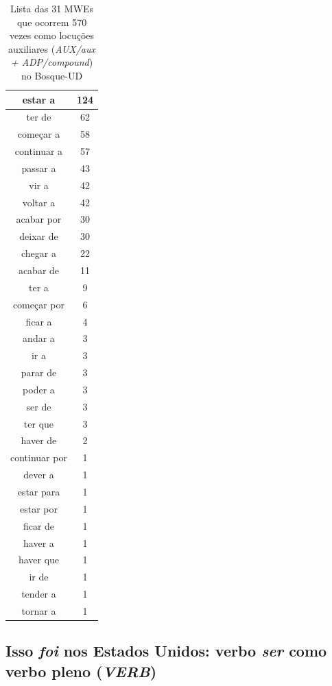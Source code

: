 \documentclass[output=paper,colorlinks,citecolor=brown]{langscibook}
\begin{document}
\begin{table}[]
{\begin{tabular}{|c|c|}
						estar a & 124\\\hline
						ter de & 62\\\hline
						começar a & 58\\\hline
						continuar a & 57\\\hline
						passar a & 43\\\hline
						vir a & 42\\\hline
						voltar a & 42\\\hline
						acabar por & 30\\\hline
						deixar de & 30\\\hline
						chegar a & 22\\\hline
						acabar de & 11\\\hline
						ter a & 9\\\hline
						começar por & 6\\\hline
						ficar a & 4\\\hline
						andar a & 3\\\hline
						ir a & 3\\\hline
						parar de & 3\\\hline
						poder a & 3\\\hline
						ser de & 3\\\hline
						ter que & 3\\\hline
						haver de & 2\\\hline
						continuar por & 1\\\hline
						dever a & 1\\\hline
						estar para & 1\\\hline
						estar por & 1\\\hline
						ficar de & 1\\\hline
						haver a & 1\\\hline
						haver que & 1\\\hline
						ir de & 1\\\hline
						tender a & 1\\\hline
						tornar a & 1\\\hline
				\end{tabular}
			}
			\caption{Lista das 31 MWEs que ocorrem 570 vezes como locuções auxiliares (\emph{AUX/aux + ADP/compound}) no Bosque-UD}
			\label{tab:auxphrasalverb}
		\end{table}


	\subsection{Isso \emph{foi} nos Estados Unidos: verbo \textit{ser} como verbo pleno (\emph{VERB})}\label{sec:serpleno}
	
\end{document}

